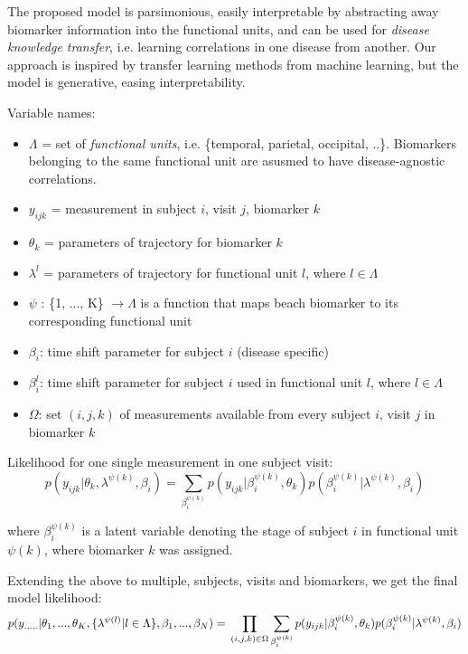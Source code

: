 \documentclass{llncs}
\begin{document}
The proposed model is parsimonious, easily interpretable by abstracting away biomarker information into the functional units, and can be used for \emph{disease knowledge transfer}, i.e. learning correlations in one disease from another. Our approach is inspired by transfer learning methods from machine learning, but the model is generative, easing interpretability.


Variable names:
\begin{itemize}
 \item $\Lambda$ = set of \emph{functional units}, i.e. \{temporal, parietal, occipital, ..\}. Biomarkers belonging to the same functional unit are asusmed to have disease-agnostic correlations.
 \item $y_{ijk}$ = measurement in subject $i$, visit $j$, biomarker $k$
 \item $\theta_k$ = parameters of trajectory for biomarker $k$
 \item $\lambda^l$ = parameters of trajectory for functional unit $l$, where $l \in \Lambda$
 \item $\psi$ : \{1, ..., K\} $ \rightarrow \Lambda$ is a function that maps beach biomarker to its corresponding functional unit
 \item $\beta_i$: time shift parameter for subject $i$ (disease specific)
 \item $\beta_i^{l}$: time shift parameter for subject $i$ used in functional unit $l$, where $l \in \Lambda$
 \item $\Omega$: set ${(i,j,k)}$ of measurements available from every subject $i$, visit $j$ in biomarker $k$
\end{itemize}

Likelihood for one single measurement in one subject visit: 
\begin{equation}
 p(y_{ijk}|\theta_k, \lambda^{\psi(k)}, \beta_i) = \sum_{\beta_i^{\psi(k)}} p(y_{ijk}| \beta_i^{\psi(k)}, \theta_k) p(\beta_i^{\psi(k)}| \lambda^{\psi(k)}, \beta_i)
\end{equation}

where $\beta_i^{\psi(k)}$ is a latent variable denoting the stage of subject $i$ in functional unit $\psi(k)$, where biomarker $k$ was assigned.

Extending the above to multiple, subjects, visits and biomarkers, we get the final model likelihood:
\begin{equation}
 p(y_{.,.,.}|\theta_1, ..., \theta_K, \{\lambda^{\psi(l)} | l \in \Lambda \}, \beta_1, ..., \beta_N) = \\ \prod_{(i,j,k) \in \Omega} \sum_{\beta_i^{\psi(k)}} p(y_{ijk}| \beta_i^{\psi(k)}, \theta_k) p(\beta_i^{\psi(k)}| \lambda^{\psi(k)}, \beta_i)
\end{equation}
\end{document}

